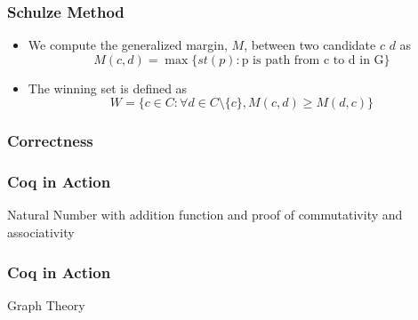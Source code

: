 \documentclass{beamer}
\begin{document}
\begin{frame}
\frametitle{Schulze Method}
\begin{itemize}
\item We compute the generalized margin, $M$, between two candidate $c$ $d$ as 
  	\[ M(c, d) = \max \lbrace st (p) : \text{p is path from c to d in G} \rbrace\]
 
 \item  	The winning set is defined as 
 \[ W =  \lbrace c \in C : \forall d \in C \setminus \{c\}, M (c, d) \geq M (d, c) \rbrace\]


\end{itemize}
\end{frame}


\begin{frame}
\frametitle{Correctness}
\begin{center}
\end{center}
\end{frame}

\begin{frame}
\frametitle{Coq in Action}
{Natural Number with addition function and proof of 
commutativity and associativity}
\lsteighteen
\end{frame}


\begin{frame}
\frametitle{Coq in Action}
{Graph Theory}
\lstf
\end{frame}
\end{document}
